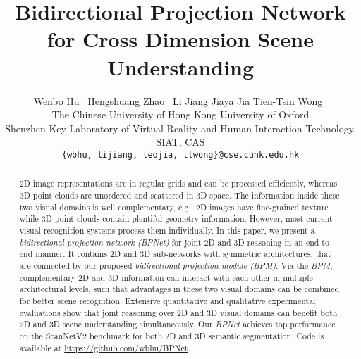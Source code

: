 \documentclass[final]{cvpr}
\begin{document}
	
\title{Bidirectional Projection Network for Cross Dimension Scene Understanding}
	
\author{Wenbo Hu\footnotemark[1]~ \quad Hengshuang Zhao\footnotemark[1]~ \quad Li Jiang \quad Jiaya Jia \quad Tien-Tsin Wong\footnotemark[2]~\\
	The Chinese University of Hong Kong \quad University of Oxford \\ Shenzhen Key Laboratory of Virtual Reality and Human Interaction Technology, SIAT, CAS\\ 
{\tt\small \{wbhu, lijiang, leojia, ttwong\}@cse.cuhk.edu.hk} 
}



\maketitle  \renewcommand{\thefootnote}{\fnsymbol{footnote}}
 

\pagestyle{empty}
\thispagestyle{empty}

\begin{abstract}
2D image representations are in regular grids and can be processed efficiently, whereas 3D point clouds are unordered and scattered in 3D space. 
The information inside these two visual domains is well complementary, e.g., 2D images have fine-grained texture while 3D point clouds contain plentiful geometry information.
However, most current visual recognition systems process them individually.
In this paper, we present a \emph{bidirectional projection network (BPNet)} for joint 2D and 3D reasoning in an end-to-end manner.
It contains 2D and 3D sub-networks with symmetric architectures, that are connected by our proposed \emph{bidirectional projection module (BPM)}.
Via the \emph{BPM}, complementary 2D and 3D information can interact with each other in multiple architectural levels, such that advantages in these two visual domains can be combined for better scene recognition.
Extensive quantitative and qualitative experimental evaluations show that joint reasoning over 2D and 3D visual domains can benefit both 2D and 3D scene understanding simultaneously.
Our \emph{BPNet} achieves top performance on the ScanNetV2 benchmark for both 2D and 3D semantic segmentation.
Code is available at \url{https://github.com/wbhu/BPNet}.
	

\end{abstract}


\vspace{-4mm}
\end{document}
